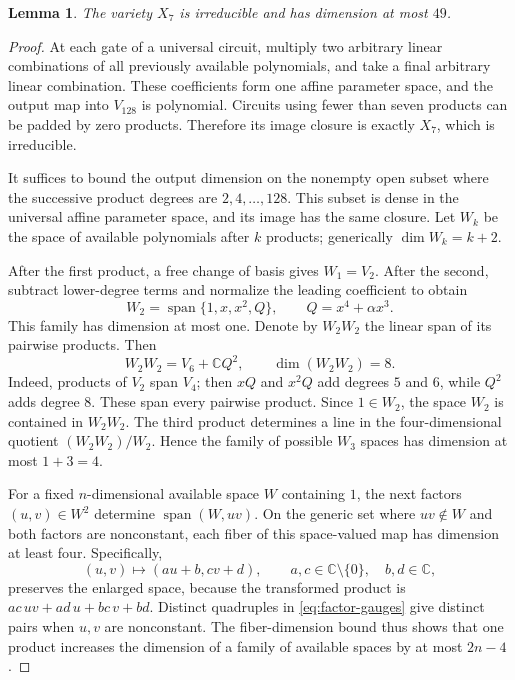 \documentclass[11pt]{article}
\newtheorem{lemma}[theorem]{Lemma}
\newcommand{\C}{\mathbb C}
\newcommand{\Span}{\operatorname{span}}
\begin{document}
\begin{lemma}\label{lem:dimension}
The variety $X_7$ is irreducible and has dimension at most $49$.
\end{lemma}

\begin{proof}
At each gate of a universal circuit, multiply two arbitrary linear
combinations of all previously available polynomials, and take a final
arbitrary linear combination. These coefficients form one affine
parameter space, and the output map into $V_{128}$ is polynomial.
Circuits using fewer than seven products can be padded by zero products.
Therefore its image closure is exactly $X_7$, which is irreducible.

It suffices to bound the output dimension on the nonempty open subset
where the successive product degrees are $2,4,\ldots,128$. This subset
is dense in the universal affine parameter space, and its image has
the same closure. Let $W_k$ be the space of available polynomials after
$k$ products; generically $\dim W_k=k+2$.

After the first product, a free change of basis gives $W_1=V_2$.
After the second, subtract lower-degree terms and normalize the leading
coefficient to obtain
\[
 W_2=\Span\{1,x,x^2,Q\},\qquad Q=x^4+\alpha x^3.
\]
This family has dimension at most one. Denote by $W_2W_2$ the linear
span of its pairwise products. Then
\begin{equation}\label{eq:product-span}
 W_2W_2=V_6+\C Q^2,\qquad \dim(W_2W_2)=8.
\end{equation}
Indeed, products of $V_2$ span $V_4$; then $xQ$ and $x^2Q$ add
degrees $5$ and $6$, while $Q^2$ adds degree $8$. These span every
pairwise product. Since $1\in W_2$, the space $W_2$ is contained in
$W_2W_2$. The third product determines a line in the four-dimensional
quotient $(W_2W_2)/W_2$. Hence the family of possible $W_3$ spaces
has dimension at most $1+3=4$.

For a fixed $n$-dimensional available space $W$ containing $1$, the
next factors $(u,v)\in W^2$ determine $\Span(W,uv)$. On the generic
set where $uv\notin W$ and both factors are nonconstant, each fiber
of this space-valued map has dimension at least four. Specifically,
\begin{equation}\label{eq:factor-gauges}
 (u,v)\longmapsto(au+b,cv+d),\qquad a,c\in\C\setminus\{0\},
 \quad b,d\in\C,
\end{equation}
preserves the enlarged space, because the transformed product is
$ac\,uv+ad\,u+bc\,v+bd$. Distinct quadruples in
\eqref{eq:factor-gauges} give distinct pairs when $u,v$ are nonconstant.
The fiber-dimension bound thus shows that one product increases the
dimension of a family of available spaces by at most $2n-4$.


\end{proof}
\end{document}

